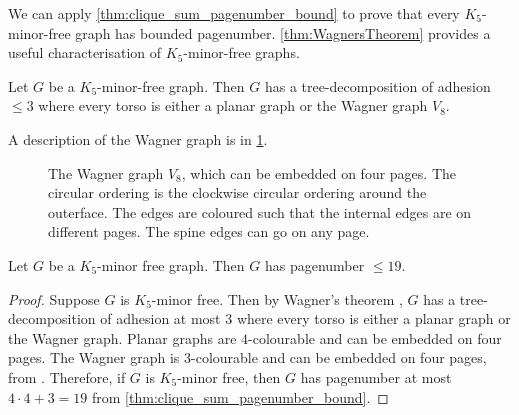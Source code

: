 We can apply \cref{thm:clique_sum_pagenumber_bound} to prove that every $K_5$-minor-free graph has bounded pagenumber. \cref{thm:WagnersTheorem} provides a useful characterisation of $K_5$-minor-free graphs. 
\begin{theorem}\label{thm:WagnersTheorem}
	Let \(G\) be a \(K_5\)-minor-free graph. Then \(G\) has a tree-decomposition of adhesion $\leq 3$ where every torso is either a planar graph or the Wagner graph \(V_8\).
\end{theorem}
A description of the Wagner graph is in \cref{fig:wagner}. 
\begin{figure}[h!]
	\centering
	\begin{tikzpicture}[thick,scale=2, every node/.style={scale=2}]
		
	\end{tikzpicture}
	\caption[Wagner graph]{The Wagner graph $V_8$, which can be embedded on four pages. The circular ordering is the clockwise circular ordering around the outerface. The edges are coloured such that the internal edges are on different pages. The spine edges can go on any page.}\label{fig:wagner}
\end{figure}

\begin{theorem}
	Let \(G\) be a \(K_5\)-minor free graph. Then \(G\) has pagenumber \(\leq 19\).
\end{theorem}

\begin{proof}
	Suppose \(G\) is \(K_5\)-minor free. Then by Wagner's theorem \cite{wagnerUeberEigenschaftEbenen1937}, \(G\) has a tree-decomposition of adhesion at most 3 where every torso is either a planar graph or the Wagner graph.
	Planar graphs are \(4\)-colourable and can be embedded on four pages. The Wagner graph is \(3\)-colourable and can be embedded on four pages, from \textcite{yannakakisEmbeddingPlanarGraphs1989}. Therefore, if \(G\) is \(K_5\)-minor free, then \(G\) has pagenumber at most \(4 \cdot 4 + 3 = 19\) from \cref{thm:clique_sum_pagenumber_bound}.
\end{proof}
